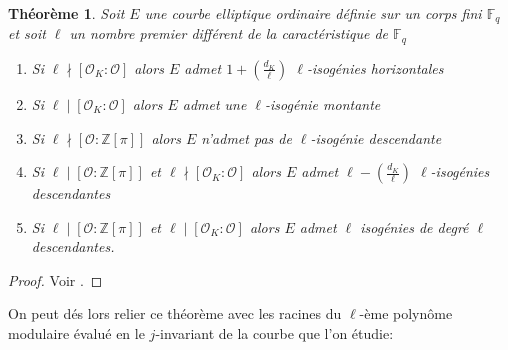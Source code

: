 \documentclass[10pt,a4paper]{book}
\theoremstyle{plain}
\newtheorem{thm}{Théorème}[chapter]
\theoremstyle{definition}
\theoremstyle{definition}
\theoremstyle{definition}
\theoremstyle{definition}
\theoremstyle{remark}
\theoremstyle{remark}
\theoremstyle{definition}
\begin{document}
\begin{thm}
\label{thm:Koh:cas}
Soit $E$ une courbe elliptique ordinaire définie sur un corps fini $\mathbb{F}_q$ et soit $\ell$ un nombre premier différent de la caractéristique de $\mathbb{F}_q$
\begin{enumerate}
\item Si $\ell \nmid [\mathcal{O}_K : \mathcal{O}]$ alors $E$ admet $ 1 + \left( \frac{d_K}{\ell} \right)$ $\ell$-isogénies horizontales
\item Si $\ell \mid [\mathcal{O}_K : \mathcal{O}]$ alors $E$ admet une $\ell$-isogénie montante
\item Si $\ell \nmid [\mathcal{O} : \mathbb{Z}[\pi]]$ alors $E$ n'admet pas de $\ell$-isogénie descendante
\item Si $\ell \mid [\mathcal{O} : \mathbb{Z}[\pi]]$ et $\ell \nmid [\mathcal{O}_K : \mathcal{O}]$ alors $E$ admet $\ell-\left( \frac{d_K}{\ell} \right)$ $\ell$-isogénies descendantes
\item  Si $\ell \mid [\mathcal{O} : \mathbb{Z}[\pi]]$ et $\ell \mid [\mathcal{O}_K : \mathcal{O}]$ alors $E$ admet $\ell$ isogénies de degré $\ell$ descendantes.
\end{enumerate}
\end{thm}

\begin{proof}
Voir \cite[Proposition 23]{Kohel96}.
\end{proof}

On peut dés lors relier ce théorème avec les racines du $\ell$-ème polynôme modulaire évalué en le $j$-invariant de la courbe que l'on étudie:
\end{document}
